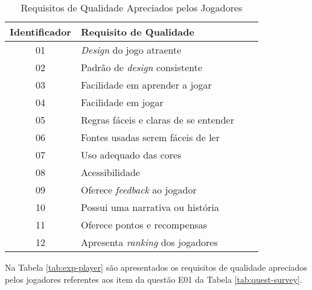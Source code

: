 \begin{apendicesenv}
\begin{table}[htbp]
\centering
\caption{Requisitos de Qualidade Apreciados pelos Jogadores}
\label{tab:req-qualit}
\begin{tabular}{clcl}
\hline
\multicolumn{1}{|c|}{\textbf{Identificador}} & \multicolumn{1}{l|}{\textbf{Requisito de Qualidade}} \\ \hline
\multicolumn{1}{|c|}{01}                  & \multicolumn{1}{l|}{\textit{Design} do jogo atraente} \\ \hline
\multicolumn{1}{|c|}{02}                  & \multicolumn{1}{l|}{Padrão de \textit{design} consistente}  \\ \hline
\multicolumn{1}{|c|}{03}                  & \multicolumn{1}{l|}{Facilidade em aprender a jogar}   \\ \hline
\multicolumn{1}{|c|}{04}                  & \multicolumn{1}{l|}{Facilidade em jogar}   \\ \hline
\multicolumn{1}{|c|}{05}                  & \multicolumn{1}{l|}{Regras fáceis e claras de se entender} \\ \hline
\multicolumn{1}{|c|}{06}                  & \multicolumn{1}{l|}{Fontes usadas serem fáceis de ler}   \\ \hline
\multicolumn{1}{|c|}{07}                  & \multicolumn{1}{l|}{Uso adequado das cores}   \\ \hline
\multicolumn{1}{|c|}{08}                  & \multicolumn{1}{l|}{Acessibilidade}  \\ \hline
\multicolumn{1}{|c|}{09}                  & \multicolumn{1}{l|}{Oferece \textit{feedback} ao jogador}           \\ \hline
\multicolumn{1}{|c|}{10}                  & \multicolumn{1}{l|}{Possui uma narrativa ou história}     \\ \hline
\multicolumn{1}{|c|}{11}                  & \multicolumn{1}{l|}{Oferece pontos e recompensas}    \\ \hline
\multicolumn{1}{|c|}{12}                  & \multicolumn{1}{l|}{Apresenta \textit{ranking} dos jogadores}  \\ \hline

\end{tabular}
\end{table}


Na Tabela \ref{tab:exp-player} são apresentados os requisitos de qualidade apreciados pelos jogadores referentes aos item da questão E01 da Tabela \ref{tab:quest-survey}.


\end{apendicesenv}

